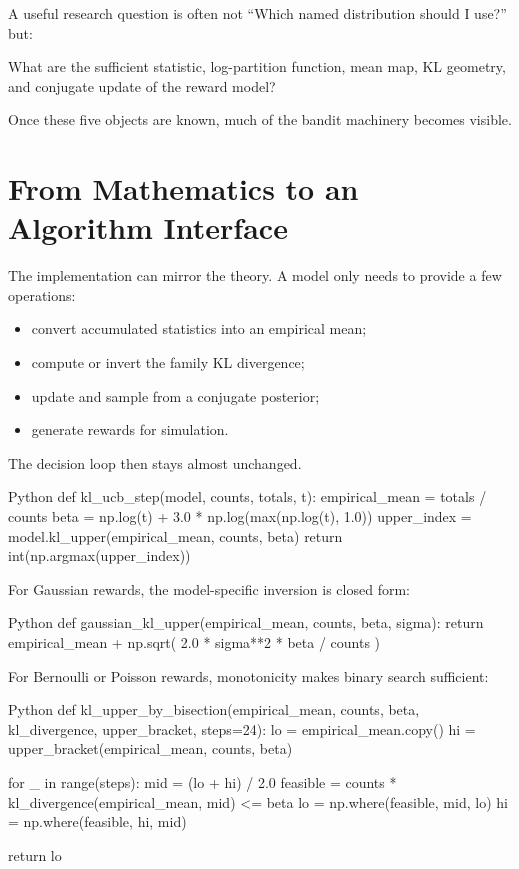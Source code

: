 \documentclass[en,nofont,11pt]{elegantbook}
\begin{document}
\begin{researchbox}
A useful research question is often not ``Which named distribution should I use?'' but:

\begin{center}
What are the sufficient statistic, log-partition function, mean map, KL geometry, and conjugate update of the reward model?
\end{center}

Once these five objects are known, much of the bandit machinery becomes visible.
\end{researchbox}

\chapter{From Mathematics to an Algorithm Interface}

The implementation can mirror the theory. A model only needs to provide a few operations:

\begin{itemize}
\item convert accumulated statistics into an empirical mean;
\item compute or invert the family KL divergence;
\item update and sample from a conjugate posterior;
\item generate rewards for simulation.
\end{itemize}

The decision loop then stays almost unchanged.

\begin{codeblock}{Python}
def kl_ucb_step(model, counts, totals, t):
    empirical_mean = totals / counts
    beta = np.log(t) + 3.0 * np.log(max(np.log(t), 1.0))
    upper_index = model.kl_upper(empirical_mean, counts, beta)
    return int(np.argmax(upper_index))
\end{codeblock}

For Gaussian rewards, the model-specific inversion is closed form:

\begin{codeblock}{Python}
def gaussian_kl_upper(empirical_mean, counts, beta, sigma):
    return empirical_mean + np.sqrt(
        2.0 * sigma**2 * beta / counts
    )
\end{codeblock}

For Bernoulli or Poisson rewards, monotonicity makes binary search sufficient:

\begin{codeblock}{Python}
def kl_upper_by_bisection(empirical_mean, counts, beta,
                          kl_divergence, upper_bracket,
                          steps=24):
    lo = empirical_mean.copy()
    hi = upper_bracket(empirical_mean, counts, beta)

    for _ in range(steps):
        mid = (lo + hi) / 2.0
        feasible = counts * kl_divergence(empirical_mean, mid) <= beta
        lo = np.where(feasible, mid, lo)
        hi = np.where(feasible, hi, mid)

    return lo
\end{codeblock}
\end{document}
